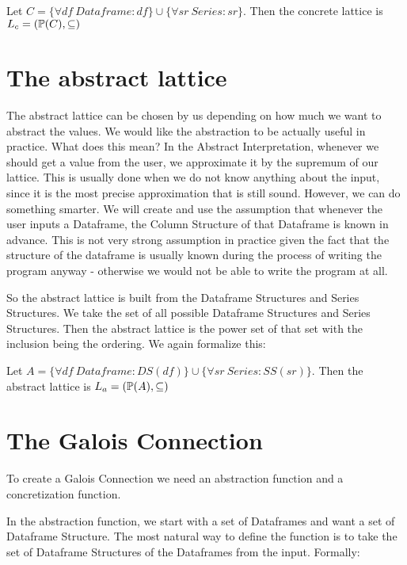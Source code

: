 \begin{defn}

    Let $C = \{\forall df \: Dataframe: df\} \cup \{\forall sr \: Series: sr\}$.
    Then the concrete lattice is $L_c = (\mathbb{P}(C), \subseteq)$
\end{defn}


\section{The abstract lattice}

The abstract lattice can be chosen by us depending on how much we want to abstract the values.
We would like the abstraction to be actually useful in practice.
What does this mean?
In the Abstract Interpretation, whenever we should get a value from the user, we approximate it by the supremum of our
lattice.
This is usually done when we do not know anything about the input, since it is the most precise approximation that is
still sound.
However, we can do something smarter.
We will create and use the assumption that whenever the user inputs a Dataframe, the Column Structure of that Dataframe
is known in advance.
This is not very strong assumption in practice given the fact that the structure of the dataframe is usually known
during the process of writing the program anyway - otherwise we would not be able to write the program at all.

So the abstract lattice is built from the Dataframe Structures and Series Structures.
We take the set of all possible Dataframe Structures and Series Structures.
Then the abstract lattice is the power set of that set with the inclusion being the ordering.
We again formalize this:

\begin{defn}

    Let $A = \{\forall df\: Dataframe: DS(df)\} \cup \{\forall sr \: Series: SS(sr)\}$.
    Then the abstract lattice is $L_a = (\mathbb{P}(A), \subseteq)$ %
\end{defn}

\section{The Galois Connection}

To create a Galois Connection we need an abstraction function and a concretization function.

In the abstraction function, we start with a set of Dataframes and want a set of Dataframe Structure.
The most natural way to define the function is to take the set of Dataframe Structures of the Dataframes from the input.
Formally:


